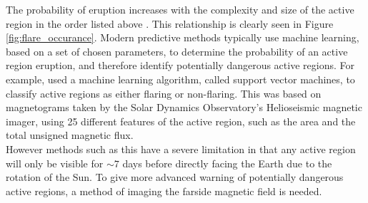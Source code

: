 \documentclass[11pt,a4paper,onecolumn]{report}
\begin{document}
The probability of eruption increases with the complexity and size of the
active region in the order listed above \citep{giovanelli_relations_1939}. This
relationship is clearly seen in Figure \ref{fig:flare_occurance}. Modern
predictive methods typically use machine learning, based on a set of chosen
parameters, to determine the probability of an active region eruption, and therefore
identify potentially dangerous active regions. For example,
\citet{bobra_solar_2015} used a machine learning algorithm, called support
vector machines, to classify active regions as either flaring or non-flaring. This was
based on magnetograms taken by the Solar Dynamics Observatory's Helioseismic
magnetic imager, using 25 different features of the active region, such as the area and the
total unsigned magnetic flux. \\


However methods such as this have a severe limitation in that any active region
will only be visible for \(\sim 7\) days before directly facing the Earth due to
the rotation of the Sun. To give more advanced warning of potentially dangerous
active regions, a method of imaging the farside magnetic field is needed. \\
\end{document}
